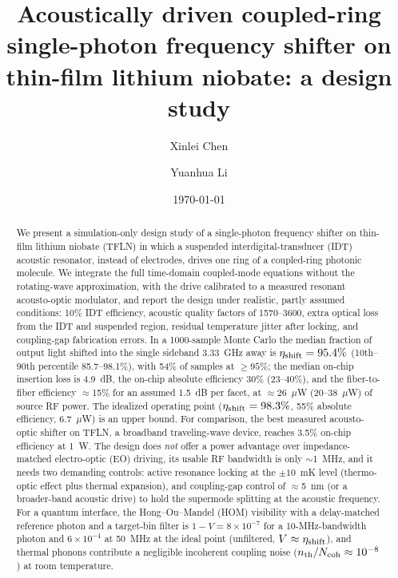 \documentclass[aps,prapplied,reprint,superscriptaddress,amsmath,amssymb,floatfix]{revtex4-2}
\newcommand{\etash}{\eta_{\rm shift}}
\begin{document}
\title{Acoustically driven coupled-ring single-photon frequency shifter on thin-film lithium niobate: a design study}

\author{Xinlei Chen}
\author{Yuanhua Li}

\date{\today}

\begin{abstract}
We present a simulation-only design study of a single-photon frequency shifter on thin-film lithium niobate (TFLN) in which a suspended interdigital-transducer (IDT) acoustic resonator, instead of electrodes, drives one ring of a coupled-ring photonic molecule. We integrate the full time-domain coupled-mode equations without the rotating-wave approximation, with the drive calibrated to a measured resonant acousto-optic modulator, and report the design under realistic, partly assumed conditions: 10\% IDT efficiency, acoustic quality factors of 1570--3600, extra optical loss from the IDT and suspended region, residual temperature jitter after locking, and coupling-gap fabrication errors. In a 1000-sample Monte Carlo the median fraction of output light shifted into the single sideband 3.33~GHz away is $\etash=95.4\%$ (10th--90th percentile 85.7--98.1\%), with 54\% of samples at $\ge95\%$; the median on-chip insertion loss is 4.9~dB, the on-chip absolute efficiency 30\% (23--40\%), and the fiber-to-fiber efficiency $\approx$15\% for an assumed 1.5~dB per facet, at $\approx$26~$\mu$W (20--38~$\mu$W) of source RF power. The idealized operating point ($\etash=98.3\%$, 55\% absolute efficiency, 6.7~$\mu$W) is an upper bound. For comparison, the best measured acousto-optic shifter on TFLN, a broadband traveling-wave device, reaches 3.5\% on-chip efficiency at 1~W. The design does \emph{not} offer a power advantage over impedance-matched electro-optic (EO) driving, its usable RF bandwidth is only $\sim$1~MHz, and it needs two demanding controls: active resonance locking at the $\pm10$~mK level (thermo-optic effect plus thermal expansion), and coupling-gap control of $\approx$5~nm (or a broader-band acoustic drive) to hold the supermode splitting at the acoustic frequency. For a quantum interface, the Hong--Ou--Mandel (HOM) visibility with a delay-matched reference photon and a target-bin filter is $1-V=8\times10^{-7}$ for a 10-MHz-bandwidth photon and $6\times10^{-4}$ at 50~MHz at the ideal point (unfiltered, $V\approx\etash$), and thermal phonons contribute a negligible incoherent coupling noise ($n_{\rm th}/N_{\rm coh}\approx10^{-8}$) at room temperature.
\end{abstract}
\end{document}
